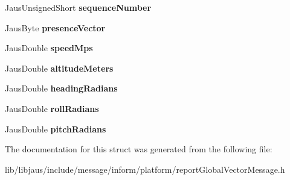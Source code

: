 \begin{DoxyCompactItemize}
\item 
\hypertarget{struct_report_global_vector_message_struct_a412e509d24dd72b647380e2ff3e37e5f}{\-Jaus\-Unsigned\-Short {\bfseries sequence\-Number}}\label{struct_report_global_vector_message_struct_a412e509d24dd72b647380e2ff3e37e5f}

\item 
\hypertarget{struct_report_global_vector_message_struct_a52bee667d130e29627b4361aa315a841}{\-Jaus\-Byte {\bfseries presence\-Vector}}\label{struct_report_global_vector_message_struct_a52bee667d130e29627b4361aa315a841}

\item 
\hypertarget{struct_report_global_vector_message_struct_a872d569e24834b6d7a460a39b32c3495}{\-Jaus\-Double {\bfseries speed\-Mps}}\label{struct_report_global_vector_message_struct_a872d569e24834b6d7a460a39b32c3495}

\item 
\hypertarget{struct_report_global_vector_message_struct_aeea8f31cbdf1ccdaad1302ec0698b146}{\-Jaus\-Double {\bfseries altitude\-Meters}}\label{struct_report_global_vector_message_struct_aeea8f31cbdf1ccdaad1302ec0698b146}

\item 
\hypertarget{struct_report_global_vector_message_struct_a46c2fcfcd52cb597ecbba973d4a1733a}{\-Jaus\-Double {\bfseries heading\-Radians}}\label{struct_report_global_vector_message_struct_a46c2fcfcd52cb597ecbba973d4a1733a}

\item 
\hypertarget{struct_report_global_vector_message_struct_abaaf53a13057e558a635bdebfa998465}{\-Jaus\-Double {\bfseries roll\-Radians}}\label{struct_report_global_vector_message_struct_abaaf53a13057e558a635bdebfa998465}

\item 
\hypertarget{struct_report_global_vector_message_struct_ad72cfa2d17d4b8b2f82ed26eaf09762a}{\-Jaus\-Double {\bfseries pitch\-Radians}}\label{struct_report_global_vector_message_struct_ad72cfa2d17d4b8b2f82ed26eaf09762a}

\end{DoxyCompactItemize}


\-The documentation for this struct was generated from the following file\-:\begin{DoxyCompactItemize}
\item 
lib/libjaus/include/message/inform/platform/report\-Global\-Vector\-Message.\-h\end{DoxyCompactItemize}

